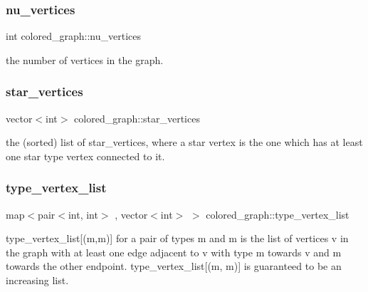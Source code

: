 \subsubsection{\texorpdfstring{nu\+\_\+vertices}{nu\_vertices}}
{\footnotesize\ttfamily int colored\+\_\+graph\+::nu\+\_\+vertices}



the number of vertices in the graph. 

\mbox{\label{classcolored__graph_ab7ee8d717abde7ad7467ef695038f574}} 
\subsubsection{\texorpdfstring{star\+\_\+vertices}{star\_vertices}}
{\footnotesize\ttfamily vector$<$int$>$ colored\+\_\+graph\+::star\+\_\+vertices}



the (sorted) list of star\+\_\+vertices, where a star vertex is the one which has at least one star type vertex connected to it. 

\mbox{\label{classcolored__graph_a8a7e4022653cdcda00155e106d8914f6}} 
\subsubsection{\texorpdfstring{type\+\_\+vertex\+\_\+list}{type\_vertex\_list}}
{\footnotesize\ttfamily map$<$pair$<$int, int$>$ , vector$<$int$>$ $>$ colored\+\_\+graph\+::type\+\_\+vertex\+\_\+list}



type\+\_\+vertex\+\_\+list\mbox{[}(m,m\textquotesingle{})\mbox{]} for a pair of types m and m\textquotesingle{} is the list of vertices v in the graph with at least one edge adjacent to v with type m towards v and m\textquotesingle{} towards the other endpoint. type\+\_\+vertex\+\_\+list\mbox{[}(m, m\textquotesingle{})\mbox{]} is guaranteed to be an increasing list. 

\mbox{\label{classcolored__graph_a2cc32e7146fa3319f83cfa940f5e1be4}} 
